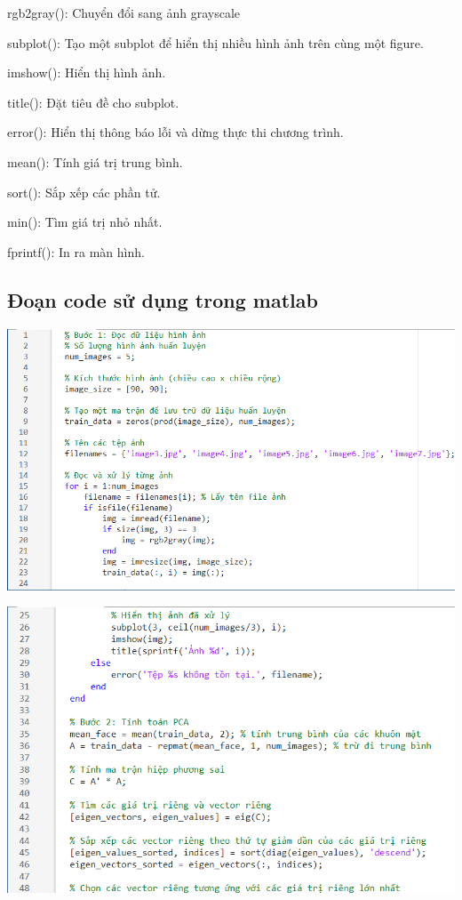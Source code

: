 \documentclass[12pt,a4paper]{article}
\begin{document}
rgb2gray(): Chuyển đổi sang ảnh grayscale

subplot(): Tạo một subplot để hiển thị nhiều hình ảnh trên cùng một figure.

imshow(): Hiển thị hình ảnh.

title(): Đặt tiêu đề cho subplot.

error(): Hiển thị thông báo lỗi và dừng thực thi chương trình.

mean(): Tính giá trị trung bình.

sort(): Sắp xếp các phần tử.

min(): Tìm giá trị nhỏ nhất.

fprintf(): In ra màn hình.
\subsection{Đoạn code sử dụng trong matlab}
\begin{center}
    \includegraphics[width = 1\textwidth]{8.png}
\end{center}
\begin{center}
    \includegraphics[width = 1\textwidth]{9.png}
\end{center}
\end{document}
